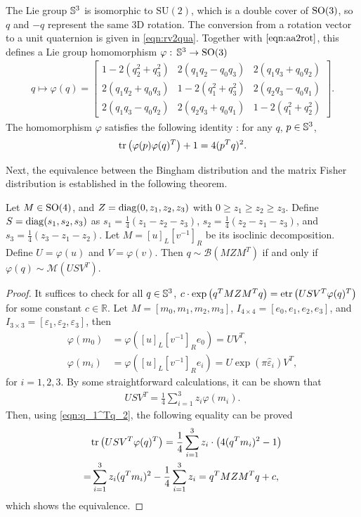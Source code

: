 The Lie group $\mathbb{S}^3$ is isomorphic to $\mathrm{SU}(2)$, which is a double cover of $\mathrm{SO}(3)$, so $q$ and $-q$ represent the same 3D rotation.
The conversion from a rotation vector to a unit quaternion is given in \eqref{eqn:rv2qua}.
Together with $\eqref{eqn:aa2rot}$, this defines a Lie group homomorphism $\varphi:\, \mathbb{S}^3\to\mathrm{SO}(3)$
\begin{align} \label{eqn:SO3-Sph3}
	q \mapsto \varphi(q) =  \begin{bmatrix}
		1-2(q_2^2+q_3^2) & 2(q_1q_2-q_0q_3) & 2(q_1q_3+q_0q_2) \\
		2(q_1q_2+q_0q_3) & 1-2(q_1^2+q_3^2) & 2(q_2q_3-q_0q_1) \\
		2(q_1q_3-q_0q_2) & 2(q_2q_3+q_0q_1) & 1-2(q_1^2+q_2^2)
	\end{bmatrix}.
\end{align}
The homomorphism $\varphi$ satisfies the following identity \cite{prentice1986orientation}:
for any $q$, $p\in\mathbb{S}^3$,
\begin{align} \label{eqn:q_1^Tq_2}
	\mathrm{tr}\left( \varphi(p)\varphi(q)^T \right) + 1 = 4(p^Tq)^2.
\end{align}

Next, the equivalence between the Bingham distribution and the matrix Fisher distribution is established in the following theorem.

\begin{theorem} \label{thm:Bh2MF}
	Let $M\in\mathrm{SO}(4)$, and $Z = \mathrm{diag}(0,z_1,z_2,z_3)$ with $0 \geq z_1 \geq z_2 \geq z_3$.
	Define $S = \mathrm{diag}(s_1,s_2,s_3)$ as $s_1 = \tfrac{1}{4}(z_1-z_2-z_3)$, $s_2 = \tfrac{1}{4}(z_2-z_1-z_3)$, and $s_3 = \tfrac{1}{4}(z_3-z_1-z_2)$.
	Let $M = [u]_L[v^{-1}]_R$ be its isoclinic decomposition.
	Define $U = \varphi(u)$ and $V = \varphi(v)$.
	Then $q\sim\mathcal{B}(MZM^T)$ if and only if $\varphi(q)\sim\mathcal{M}(USV^T)$.
\end{theorem}
\begin{proof}
	It suffices to check for all $q\in\mathbb{S}^3$, $c\cdot\exp\left(q^TMZM^Tq\right) = \mathrm{etr}\left( USV^T\varphi(q)^T \right)$ for some constant $c\in\mathbb{R}$.
	Let $M = [m_0, m_1, m_2, m_3]$, $I_{4\times 4} = [e_0, e_1, e_2, e_3]$, and $I_{3\times 3} = [\varepsilon_1, \varepsilon_2, \varepsilon_3]$, then
	\begin{align}
		\varphi(m_0) &= \varphi([u]_L[v^{-1}]_Re_0) = UV^T, \label{eqn:Bh2MF-mean} \\
		\varphi(m_i) &= \varphi([u]_L[v^{-1}]_Re_i) = U\exp(\pi\hat{\varepsilon}_i) V^T \label{eqn:Bh2MF-principal},
	\end{align}
	for $i=1,2,3$.
	By some straightforward calculations, it can be shown that
	\begin{align*}
		USV^T = \frac{1}{4}\sum_{i=1}^{3} z_i\varphi(m_i).
	\end{align*}
	Then, using \eqref{eqn:q_1^Tq_2}, the following equality can be proved
	\begin{align*}
		&\mathrm{tr}\left( USV^T\varphi(q)^T \right) = \frac{1}{4} \sum_{i=1}^3 z_i\cdot\left( 4(q^Tm_i)^2-1 \right) \\
		= &\sum_{i=1}^3 z_i(q^Tm_i)^2 - \frac{1}{4}\sum_{i=1}^3 z_i = q^TMZM^Tq + c,
	\end{align*}
	which shows the equivalence.
\end{proof}

